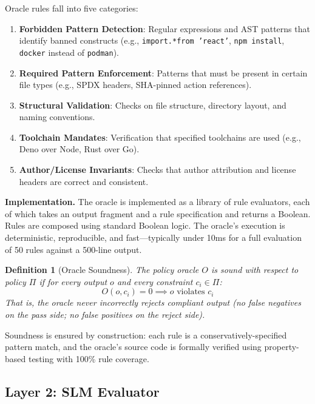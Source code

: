 \documentclass[11pt,a4paper]{article}
\newtheorem{definition}{Definition}[section]
\begin{document}
Oracle rules fall into five categories:

\begin{enumerate}
  \item \textbf{Forbidden Pattern Detection}: Regular expressions
        and AST patterns that identify banned constructs
        (e.g., \texttt{import.*from 'react'}, \texttt{npm install},
        \texttt{docker} instead of \texttt{podman}).
  \item \textbf{Required Pattern Enforcement}: Patterns that must
        be present in certain file types (e.g., SPDX headers,
        SHA-pinned action references).
  \item \textbf{Structural Validation}: Checks on file structure,
        directory layout, and naming conventions.
  \item \textbf{Toolchain Mandates}: Verification that specified
        toolchains are used (e.g., Deno over Node, Rust over Go).
  \item \textbf{Author/License Invariants}: Checks that author
        attribution and license headers are correct and consistent.
\end{enumerate}

\textbf{Implementation.}  The oracle is implemented as a library of
rule evaluators, each of which takes an output fragment and a rule
specification and returns a Boolean.  Rules are composed using
standard Boolean logic.  The oracle's execution is deterministic,
reproducible, and fast---typically under 10ms for a full evaluation
of 50 rules against a 500-line output.

\begin{definition}[Oracle Soundness]
\label{def:oracle-soundness}
The policy oracle $O$ is \emph{sound} with respect to policy $\Pi$
if for every output $o$ and every constraint $c_i \in \Pi$:
\begin{equation}
  O(o, c_i) = 0 \implies o \text{ violates } c_i
\end{equation}
That is, the oracle never incorrectly rejects compliant output
(no false negatives on the pass side; no false positives on the
reject side).
\end{definition}

Soundness is ensured by construction: each rule is a
conservatively-specified pattern match, and the oracle's source
code is formally verified using property-based testing with
100\% rule coverage.

\subsection{Layer 2: SLM Evaluator}
\label{sec:slm}
\end{document}
